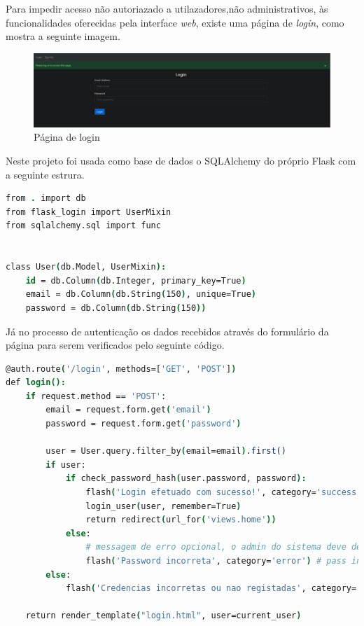 Para impedir acesso não autoriazado a utilazadores,não administrativos, às 
funcionalidades oferecidas pela 
interface \textit{web}, existe uma página de \textit{login}, como mostra a 
seguinte imagem.


\begin{figure}[H]
\begin{center}
\includegraphics[width=16cm]{figs/login.png}
\caption{Página de login}
\label{fig:bookstack}
\end{center}
\end{figure}


Neste projeto foi usada como base de dados o SQLAlchemy do próprio Flask com a
seguinte estrura.
\begin{lstlisting}[language=csh, caption={Estrutura da base de dados}]
from . import db
from flask_login import UserMixin
from sqlalchemy.sql import func


class User(db.Model, UserMixin):
    id = db.Column(db.Integer, primary_key=True)
    email = db.Column(db.String(150), unique=True)
    password = db.Column(db.String(150))
\end{lstlisting}


Já no processo de autenticação os dados recebidos através do formulário da
página para serem verificados pelo seguinte código.

\begin{lstlisting}[language=csh, caption={Autenticação na página de login}]
@auth.route('/login', methods=['GET', 'POST'])
def login():
    if request.method == 'POST':
        email = request.form.get('email')
        password = request.form.get('password')

        user = User.query.filter_by(email=email).first()
        if user:
            if check_password_hash(user.password, password):
                flash('Login efetuado com sucesso!', category='success')
                login_user(user, remember=True)
                return redirect(url_for('views.home'))
            else:
                # messagem de erro opcional, o admin do sistema deve decidir se quer usar ou nao
                flash('Password incorreta', category='error') # pass incorreta
        else:
            flash('Credencias incorretas ou nao registadas', category='error') # email nao registado

    return render_template("login.html", user=current_user)
\end{lstlisting}

